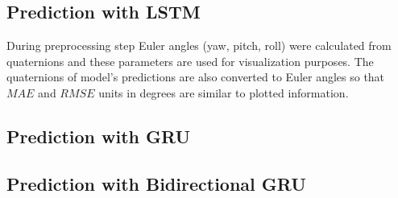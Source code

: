 \subsection{Prediction with LSTM}
\label{sec:eval:experiments:lstm}

During preprocessing step Euler angles (yaw, pitch, roll) were calculated from quaternions and these parameters are used for visualization purposes. The quaternions of model's predictions are also converted to Euler angles so that $MAE$ and $RMSE$ units in degrees are similar to plotted information. 

\subsection{Prediction with GRU}
\label{sec:eval:experiments:gru}

\subsection{Prediction with Bidirectional GRU}
\label{sec:eval:experiments:bi-gru}